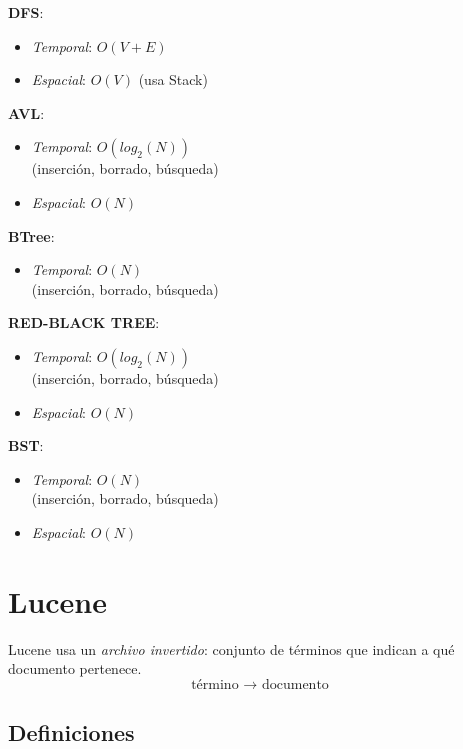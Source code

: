 \documentclass{article}
\begin{document}
\begin{multicols}{2}
\textbf{DFS}:
\begin{itemize}
    \item \emph{Temporal}: $O(V + E)$ 
    \item \emph{Espacial}: $O(V)$ (usa Stack)
\end{itemize}

\textbf{AVL}:
\begin{itemize}
    \item \emph{Temporal}: $O(log_2(N))$ 
    \\(inserción, borrado, búsqueda)
    \item \emph{Espacial}: $O(N)$ 
\end{itemize}

\textbf{BTree}:
\begin{itemize}
    \item \emph{Temporal}: $O(N)$ 
    \\(inserción, borrado, búsqueda)
\end{itemize}

\textbf{RED-BLACK TREE}:
\begin{itemize}
    \item \emph{Temporal}: $O(log_2(N))$ 
    \\(inserción, borrado, búsqueda)
    \item \emph{Espacial}: $O(N)$ 
\end{itemize}

\textbf{BST}:
\begin{itemize}
    \item \emph{Temporal}: $O(N)$ 
    \\(inserción, borrado, búsqueda)
    \item \emph{Espacial}: $O(N)$ 
\end{itemize}

\end{multicols}

\newpage
\section{Lucene}
Lucene usa un \emph{archivo invertido}: conjunto de términos que indican a qué documento pertenece.
\begin{equation*}
    \text{término $\rightarrow$ documento} 
\end{equation*}

\subsection{Definiciones}
\end{document}
